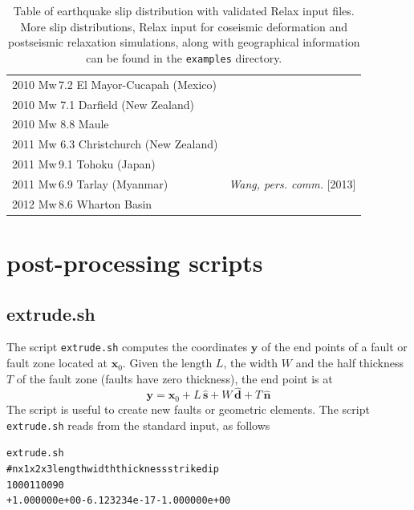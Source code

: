 \documentclass[10pt]{article}
\begin{document}
\begin{table}[h]
\begin{tabular}{l|l}
2010 Mw\,7.2 El Mayor-Cucapah (Mexico) & \cite{swei+11}\\
2010 Mw 7.1 Darfield (New Zealand) & \cite{elliott+12}\\
2010 Mw 8.8 Maule & \cite{lorito+11,luttrell+11}\\
2011 Mw 6.3 Christchurch (New Zealand) & \cite{elliott+12}\\
2011 Mw\,9.1 Tohoku (Japan) & \cite{swei+12,yamazaki+11}\\
2011 Mw\,6.9 Tarlay (Myanmar) & \textit{Wang, pers. comm.} [2013]\\
2012 Mw\,8.6 Wharton Basin & \cite{swei+13}\\
\hline
\end{tabular}
\caption{Table of earthquake slip distribution with validated Relax input files. More slip distributions, Relax input for coseismic deformation and postseismic relaxation simulations, along with geographical information can be found in the \texttt{examples} directory.}\label{tbl:input}
\end{table}

\clearpage

\section{post-processing scripts}

\subsection{extrude.sh}

The script \verb'extrude.sh' computes the coordinates $\textbf{y}$ of the end points of a fault or fault zone located at $\textbf{x}_0$. Given the length $L$, the width $W$ and the half thickness $T$ of the fault zone (faults have zero thickness), the end point is at
\begin{equation}
\textbf{y}=\textbf{x}_0+L\,\hat{\textbf{s}}+W\,\hat{\textbf{d}}+T\,\hat{\textbf{n}}
\end{equation}
The script is useful to create new faults or geometric elements. The script \verb'extrude.sh' reads from the standard input, as follows
\begin{alltt}
extrude.sh
#  n   x1   x2   x3 length width thickness strike dip
{\color{orange}   1    0    0    0      1     1         0      0  90}
{\color{blue}+1.000000e+00 -6.123234e-17 -1.000000e+00}
\end{alltt}
\end{document}

